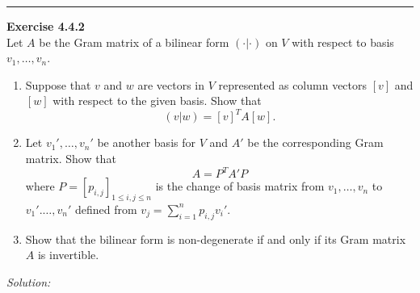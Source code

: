 \documentclass[a4paper, 12pt]{article}
\newenvironment{problem}[2][Exercise]
    { \begin{mdframed}[backgroundcolor=gray!20] \textbf{#1 #2} \\}
    {  \end{mdframed}}
\newenvironment{solution}
    {\textit{Solution:}}
    {}
\begin{document}
\noindent\rule{7in}{2.8pt}


\begin{problem}{4.4.2}
Let \(A\) be the Gram matrix of a bilinear form \((\cdot|\cdot)\) on \(V\) with respect to basis \(v_1,\ldots,v_n\).
\begin{enumerate}[(1)]
\item Suppose that \(v\) and \(w\) are vectors in \(V\) represented as column vectors \([v]\) and \([w]\) with respect to the given basis. Show that 
       \[(v|w)=[v]^TA[w].\]
\item Let \(v_1',\ldots, v_n'\) be another basis for \(V\) and \(A'\) be the corresponding Gram matrix. Show that 
       \[A=P^TA'P \]
	   where \(P=[p_{i,j}]_{1\leq i,j\leq n}\) is the change of basis matrix from \(v_1,\ldots,v_n\) to \(v_1'.\ldots,v_n'\) defined from \(v_j=\sum_{i=1}^{n}p_{i,j}v_i'\).
\item Show that the bilinear form is non-degenerate if and only if its Gram matrix \(A\) is invertible.
\end{enumerate}
\end{problem}
\begin{solution}
	
\end{solution}
\end{document}
